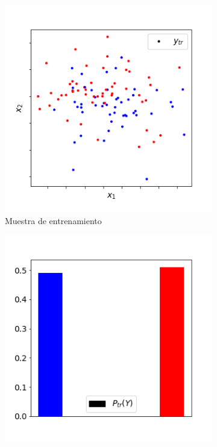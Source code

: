 \begin{figure}[h]
    \centering
    \begin{subfigure}[t]{0.4\textwidth}
        \centering
        \includegraphics[width=\textwidth]{../plots_teoria/cambios_train_scatterplot.png}
        \caption{Muestra de entrenamiento}\label{cambios:datos_tr}
    \end{subfigure}
    \hfill
    \begin{subfigure}[t]{0.4\textwidth}
        \centering
        \includegraphics[width=\textwidth]{../plots_teoria/cambios_train_barplot.png}

\end{subfigure}
\end{figure}
